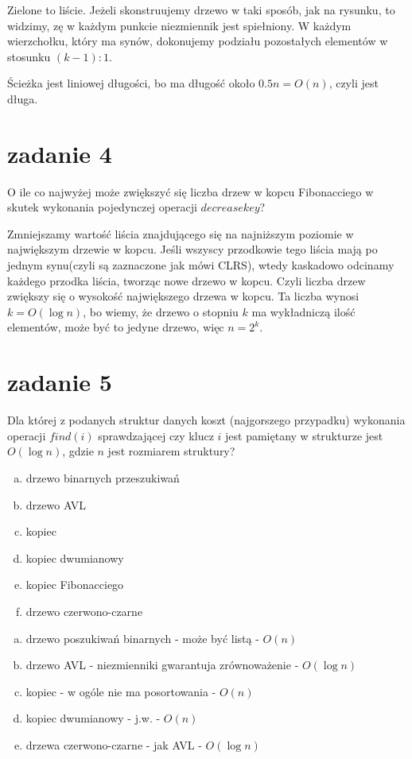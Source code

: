\documentclass[svgnames]{report}
\begin{document}
Zielone to liście.
Jeżeli skonstruujemy drzewo w taki sposób, jak na rysunku, to widzimy, zę w każdym punkcie niezmiennik jest spiełniony.
W każdym wierzchołku, który ma synów, dokonujemy podziału pozostałych elementów w stosunku $(k-1):1$.

Ścieżka jest liniowej długości, bo ma długość około $0.5n = O(n)$, czyli jest długa.

\section{zadanie 4}
\begin{framed}
O ile co najwyżej może zwiększyć się liczba drzew w kopcu Fibonacciego w skutek wykonania  pojedynczej operacji $decreasekey$?
\end{framed}
Zmniejszamy wartość liścia znajdującego się na najniższym poziomie w największym drzewie w kopcu. Jeśli wszyscy przodkowie tego liścia mają po jednym synu(czyli są zaznaczone jak mówi CLRS), wtedy kaskadowo odcinamy każdego przodka liścia, tworząc nowe drzewo w kopcu.
Czyli liczba drzew zwiększy się o wysokość największego drzewa w kopcu.
Ta liczba wynosi $k = O(\log n)$, bo wiemy, że drzewo o stopniu $k$ ma wykładniczą ilość elementów, może być to jedyne drzewo, więc $n=2^k$.

\section{zadanie 5}
\begin{framed}
Dla której z podanych struktur danych koszt (najgorszego przypadku) wykonania operacji $find(i)$ sprawdzającej czy klucz $i$ jest pamiętany w strukturze jest $O(\log n)$, gdzie $n$ jest rozmiarem struktury?
\begin{enumerate}[a)]
	\item drzewo binarnych przeszukiwań
	\item drzewo AVL
	\item kopiec
	\item kopiec dwumianowy
	\item kopiec Fibonacciego
	\item drzewo czerwono-czarne
\end{enumerate}
\end{framed}
\begin{enumerate}[a)]
\item drzewo poszukiwań binarnych - może być listą - $O(n)$
\item drzewo AVL - niezmienniki gwarantuja zrównoważenie - $O(\log n)$
\item kopiec -  w ogóle nie ma posortowania - $O(n)$
\item kopiec dwumianowy - j.w. - $O(n)$
\item drzewa czerwono-czarne - jak AVL - $O(\log n)$
\end{enumerate}
\end{document}

